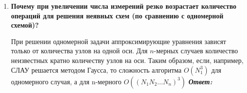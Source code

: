\documentclass[12pt, a4paper]{article}
\begin{document}
\begin{enumerate}
		\item \textbf{ Почему при увеличении числа измерений резко возрастает количество операций для решения неявных схем (по сравнению с одномерной схемой)?}
		\vspace*{0.2cm}
		 
		 При решении одномерной задачи аппроксимирующие уравнения зависят только от количества узлов на одной оси. Для $n$-мерных случаев количество неизвестных кратно количеству узлов на оси. Таким образом, если, например, СЛАУ решается методом Гаусса, то сложность алгоритма $O(N_1^3)$ для одномерного случая, а для n-мерного $O((N_1 N_2 \ldots N_n)^3)$ 
		\textit{\textbf{Ответ:}}
	\end{enumerate}
	
\end{document}
